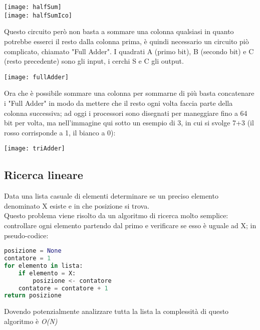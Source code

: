 \begin{center}
\texttt{[image: halfSum]}\\
\texttt{[image: halfSumIco]}
\end{center}
Questo circuito però non basta a sommare una colonna qualsiasi in quanto potrebbe esserci il resto dalla colonna prima, è quindi necessario un circuito piò complicato, chiamato "Full Adder". I quadrati A (primo bit), B (secondo bit) e C (resto precedente) sono gli input, i cerchi S e C gli output.
\begin{center}
\texttt{[image: fullAdder]}
\end{center}
Ora che è possibile sommare una colonna per sommarne di più basta concatenare i "Full Adder" in modo da mettere che il resto ogni volta faccia parte della colonna successiva; ad oggi i processori sono disegnati per maneggiare fino a 64 bit per volta, ma nell'immagine qui sotto un esempio di 3, in cui si svolge 7+3 (il rosso corrisponde a 1, il bianco a 0):
\begin{center}
\texttt{[image: triAdder]}
\end{center}
\subsection{Ricerca lineare}
Data una lista casuale di elementi determinare se un preciso elemento denominato X esiste e in che posizione si trova.\\
Questo problema viene risolto da un algoritmo di ricerca molto semplice: controllare ogni elemento partendo dal primo e verificare se esso è uguale ad X; in pseudo-codice:
\begin{lstlisting}[language=python]
posizione = None
contatore = 1
for elemento in lista:
	if elemento = X:
		posizione <- contatore
	contatore = contatore + 1
return posizione
\end{lstlisting}
Dovendo potenzialmente analizzare tutta la lista la complessità di questo algoritmo è \textit{O(N)}
